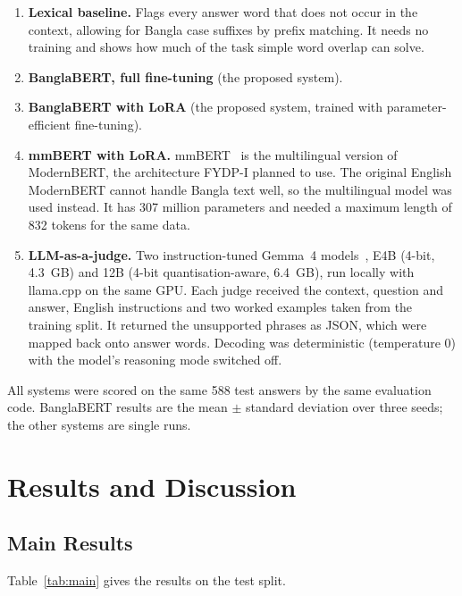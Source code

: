 \begin{enumerate}
  \item \textbf{Lexical baseline.} Flags every answer word that does not occur
  in the context, allowing for Bangla case suffixes by prefix matching. It needs
  no training and shows how much of the task simple word overlap can solve.
  \item \textbf{BanglaBERT, full fine-tuning} (the proposed system).
  \item \textbf{BanglaBERT with LoRA} (the proposed system, trained with
  parameter-efficient fine-tuning).
  \item \textbf{mmBERT with LoRA.} mmBERT~\cite{mmbert} is the multilingual
  version of ModernBERT, the architecture FYDP-I planned to use. The original
  English ModernBERT cannot handle Bangla text well, so the multilingual model
  was used instead. It has 307 million parameters and needed a maximum length
  of 832 tokens for the same data.
  \item \textbf{LLM-as-a-judge.} Two instruction-tuned Gemma~4
  models~\cite{gemma4}, E4B (4-bit, 4.3~GB) and 12B (4-bit
  quantisation-aware, 6.4~GB), run locally with llama.cpp on the same GPU. Each
  judge received the context, question and answer, English instructions and
  two worked examples taken from the training split. It returned the
  unsupported phrases as JSON, which were mapped back onto answer words.
  Decoding was deterministic (temperature 0) with the model's reasoning mode
  switched off.
\end{enumerate}

All systems were scored on the same 588 test answers by the same evaluation
code. BanglaBERT results are the mean $\pm$ standard deviation over three
seeds; the other systems are single runs.

\section{Results and Discussion}
\label{sec:results}

\subsection{Main Results}

Table~\ref{tab:main} gives the results on the test split.

